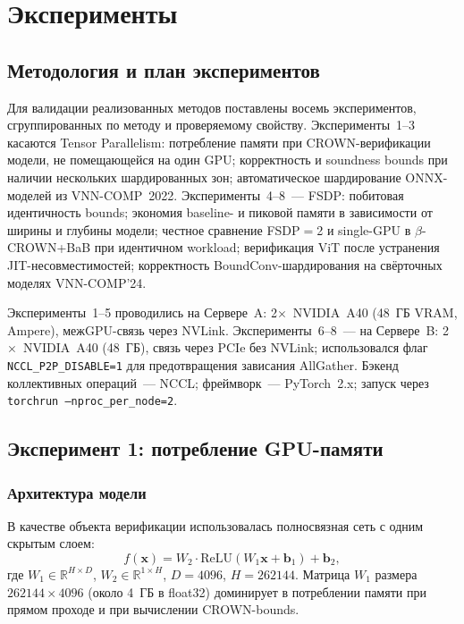 \section{Эксперименты}

\subsection{Методология и план экспериментов}

Для валидации реализованных методов поставлены восемь экспериментов,
сгруппированных по методу и проверяемому свойству.
Эксперименты~1--3 касаются Tensor Parallelism:
потребление памяти при CROWN-верификации модели, не помещающейся
на один GPU; корректность и soundness bounds при наличии нескольких
шардированных зон; автоматическое шардирование ONNX-моделей из
VNN-COMP~2022.
Эксперименты~4--8~--- FSDP:
побитовая идентичность bounds; экономия baseline- и пиковой памяти
в зависимости от ширины и глубины модели; честное сравнение
FSDP$=$2 и single-GPU в $\beta$-CROWN+BaB при идентичном workload;
верификация ViT после устранения JIT-несовместимостей; корректность
BoundConv-шардирования на свёрточных моделях VNN-COMP'24.

Эксперименты~1--5 проводились на Сервере~A: 2$\times$~NVIDIA~A40
(48~ГБ VRAM, Ampere), межGPU-связь через NVLink.
Эксперименты~6--8~--- на Сервере~B: 2$\times$~NVIDIA~A40 (48~ГБ),
связь через PCIe без NVLink; использовался флаг
\texttt{NCCL\_P2P\_DISABLE=1} для предотвращения зависания AllGather.
Бэкенд коллективных операций~--- NCCL; фреймворк~--- PyTorch~2.x;
запуск через \texttt{torchrun --nproc\_per\_node=2}.

\subsection{Эксперимент 1: потребление GPU-памяти}

\subsubsection{Архитектура модели}

В качестве объекта верификации использовалась полносвязная сеть
с одним скрытым слоем:
$$f(\mathbf{x}) = W_2 \cdot \mathrm{ReLU}(W_1 \mathbf{x} + \mathbf{b}_1) + \mathbf{b}_2,$$
где $W_1 \in \mathbb{R}^{H \times D}$, $W_2 \in \mathbb{R}^{1 \times H}$,
$D = 4096$, $H = 262144$.
Матрица $W_1$ размера $262144 \times 4096$ (около 4~ГБ в float32)
доминирует в потреблении памяти при прямом проходе и при вычислении
CROWN-bounds.

